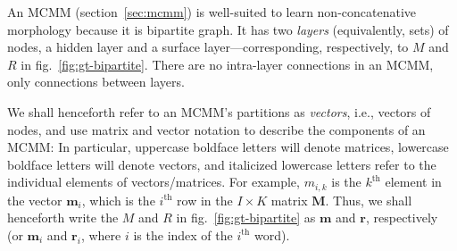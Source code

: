 An MCMM (section~\ref{sec:mcmm}) is well-suited to learn 
non-concatenative morphology because it is bipartite graph. It has two
\emph{layers} (equivalently, sets) of nodes, a hidden layer and a
surface layer---corresponding, respectively, to $M$ and $R$ in
fig.~\ref{fig:gt-bipartite}. There are no intra-layer connections in an
MCMM, only connections between layers.

We shall henceforth refer to an MCMM's partitions as
\emph{vectors}, i.e., vectors of nodes, and use matrix and vector notation to
describe the components of an MCMM:
In particular, 
uppercase boldface letters will denote matrices, %
lowercase boldface letters will denote vectors,
and italicized lowercase letters refer to the individual elements
of vectors/matrices. %
For example, $m_{i,k}$ is the $k^{\text{th}}$ element in the vector
$\mathbf{m}_i$, which is the $i^{\text{th}}$ row in the $I \times K$ matrix
$\mathbf{M}$. Thus, we shall henceforth write the $M$ and $R$ in
fig.~\ref{fig:gt-bipartite} as $\mathbf{m}$ and $\mathbf{r}$,
respectively (or $\mathbf{m}_i$ and $\mathbf{r}_i$, where $i$ is the
index of the $i^{\text{th}}$ word).